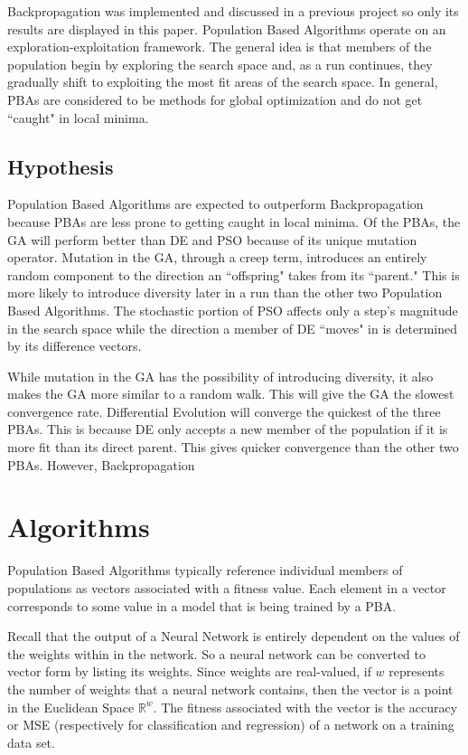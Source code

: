 \documentclass[twoside,11pt]{article}
\begin{document}
	Backpropagation was implemented and discussed in a previous project so only its results are displayed in this paper. Population Based Algorithms operate on an exploration-exploitation framework.
	The general idea is that members of the population begin by exploring the search space and, as a run continues, they gradually shift to exploiting the most fit areas of the search space. 
	In general, PBAs are considered to be methods for global optimization and do not get ``caught" in local minima.

\subsection{Hypothesis}

	Population Based Algorithms are expected to outperform Backpropagation because PBAs are less prone to getting caught in local minima.
	Of the PBAs, the GA will perform better than DE and PSO because of its unique mutation operator. 
	Mutation in the GA, through a creep term, introduces an entirely random component to the direction an ``offspring" takes from its ``parent." 
	This is more likely to introduce diversity later in a run than the other two Population Based Algorithms. 
	The stochastic portion of PSO affects only a step's magnitude in the search space while the direction a member of DE ``moves" in is determined by its difference vectors.
	
	While mutation in the GA has the possibility of introducing diversity, it also makes the GA more similar to a random walk. This will give the GA the slowest convergence rate. 
	Differential Evolution will converge the quickest of the three PBAs. This is because DE only accepts a new member of the population if it is more fit than its direct parent. 
	This gives quicker convergence than the other two PBAs. However, Backpropagation 

\section{Algorithms}

	Population Based Algorithms typically reference individual members of populations as vectors associated with a fitness value. Each element in a vector corresponds to some value in a model that is being trained by a PBA.

	Recall that the output of a Neural Network is entirely dependent on the values of the weights within in the network.
	So a neural network can be converted to vector form by listing its weights.
	Since weights are real-valued, if $w$ represents the number of weights that a neural network contains, then the vector is a point in the Euclidean Space $\mathbb{R}^w$.
	The fitness associated with the vector is the accuracy or MSE (respectively for classification and regression) of a network on a training data set.
\end{document}
